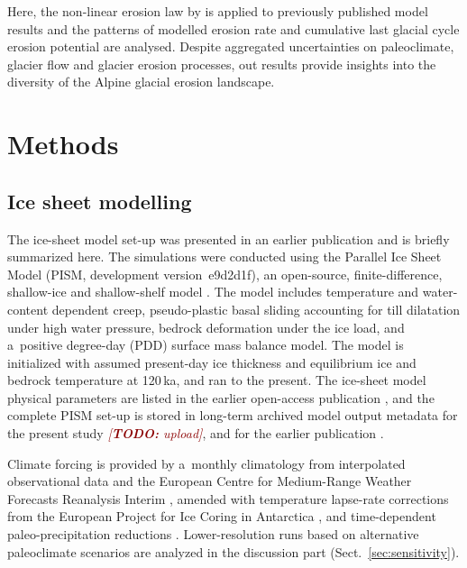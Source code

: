 \documentclass[utf8]{article}
\newcommand{\todo}[1]{\textcolor{darkred}{\emph{[\textbf{TODO:} #1]}}}
\begin{document}
    Here, the non-linear erosion law by \citet{Koppes.etal.2015} is applied to
    previously published model results \citep{Seguinot.etal.2018} and the
    patterns of modelled erosion rate and cumulative last glacial cycle erosion
    potential are analysed. Despite aggregated uncertainties on paleoclimate,
    glacier flow and glacier erosion processes, out results provide insights
    into the diversity of the Alpine glacial erosion landscape.


\section{Methods}

\subsection{Ice sheet modelling}

    The ice-sheet model set-up was presented in an earlier publication
    \citep{Seguinot.etal.2018} and is briefly summarized here. The simulations
    were conducted using the Parallel Ice Sheet Model (PISM, development
    version~e9d2d1f), an open-source, finite-difference, shallow-ice and
    shallow-shelf model
    \citep{PISM-authors.2017}. The model includes temperature and water-content
    dependent creep, pseudo-plastic basal sliding accounting for till
    dilatation under high water pressure, bedrock deformation under the ice
    load, and a~positive degree-day (PDD) surface mass balance model. The model
    is initialized with assumed present-day ice thickness and equilibrium
    ice and bedrock temperature at 120\,ka, and ran to the present.
    The ice-sheet model physical parameters are listed in the earlier
    open-access publication \citep{Seguinot.etal.2018}, and the complete PISM
    set-up is stored in long-term archived model output metadata for the
    present study \todo{upload}, and for the earlier publication
    \citep{Seguinot.2020, Seguinot.2020a}.

    Climate forcing is provided by a~monthly climatology from interpolated
    observational data \citep[WorldClim;][]{Hijmans.etal.2005} and the European
    Centre for Medium-Range Weather Forecasts Reanalysis Interim
    \citep[ERA-Interim;][]{Dee.etal.2011}, amended with temperature lapse-rate
    corrections from the European Project for Ice Coring in Antarctica
    \citep[EPICA;][] {Jouzel.etal.2007}, and time-dependent paleo-precipitation
    reductions \citep{Huybrechts.2002}. Lower-resolution runs based on
    alternative paleoclimate scenarios \citep{Seguinot.etal.2018} are analyzed
    in the discussion part (Sect.~\ref{sec:sensitivity}).
\end{document}
